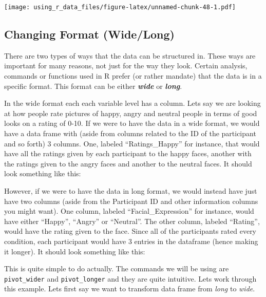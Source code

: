 \documentclass[
]{book}
\begin{document}
\texttt{[image: using\_r\_data\_files/figure-latex/unnamed-chunk-48-1.pdf]}

\hypertarget{changing-format-widelong}{%
\subsection{Changing Format (Wide/Long)}\label{changing-format-widelong}}

There are two types of ways that the data can be structured in.
These ways are important for many reasons, not just for the way they look.
Certain analysis, commands or functions used in R prefer (or rather mandate) that the data is in a specific format.
This format can be either \textbf{\emph{wide}} or \textbf{\emph{long}}.

In the wide format each each variable level has a column.
Lets say we are looking at how people rate pictures of happy, angry and neutral people in terms of good looks on a rating of 0-10.
If we were to have the data in a wide format, we would have a data frame with (aside from columns related to the ID of the participant and so forth) 3 columns.
One, labeled ``Ratings\_Happy'' for instance, that would have all the ratings given by each participant to the happy faces, another with the ratings given to the angry faces and another to the neutral faces.
It should look something like this:

However, if we were to have the data in long format, we would instead have just have two columns (aside from the Participant ID and other information columns you might want).
One column, labeled ``Facial\_Expression'' for instance, would have either ``Happy'', ``Angry'' or ``Neutral''.
The other column, labeled ``Rating'', would have the rating given to the face.
Since all of the participants rated every condition, each participant would have 3 entries in the dataframe (hence making it longer).
It should look something like this:

This is quite simple to do actually.
The commands we will be using are \texttt{pivot\_wider} and \texttt{pivot\_longer} and they are quite intuitive.
Lets work through this example.
Lets first say we want to transform data frame from \emph{long} to \emph{wide}.
\end{document}
